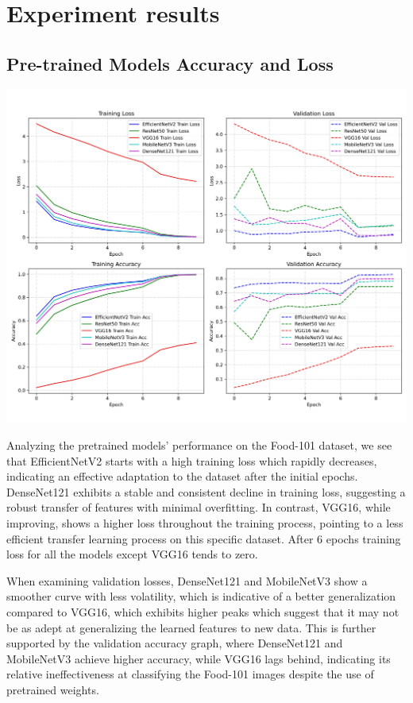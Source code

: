 \documentclass{article}
\begin{document}
\section{Experiment results}

\subsection*{Pre-trained Models Accuracy and Loss}

\begin{center}
    \includegraphics[width=1\linewidth]{images/pt_models.jpg}
\end{center}

Analyzing the pretrained models' performance on the Food-101 dataset, we see that EfficientNetV2 starts with a high training loss which rapidly decreases, indicating an effective adaptation to the dataset after the initial epochs. DenseNet121 exhibits a stable and consistent decline in training loss, suggesting a robust transfer of features with minimal overfitting. In contrast, VGG16, while improving, shows a higher loss throughout the training process, pointing to a less efficient transfer learning process on this specific dataset. After 6 epochs training loss for all the models except VGG16 tends to zero.

When examining validation losses, DenseNet121 and MobileNetV3 show a smoother curve with less volatility, which is indicative of a better generalization compared to VGG16, which exhibits higher peaks which suggest that it may not be as adept at generalizing the learned features to new data. This is further supported by the validation accuracy graph, where DenseNet121 and MobileNetV3 achieve higher accuracy, while VGG16 lags behind, indicating its relative ineffectiveness at classifying the Food-101 images despite the use of pretrained weights.
\end{document}
